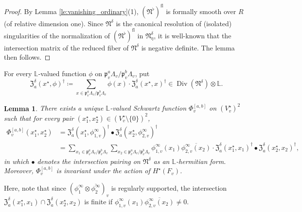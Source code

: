 \documentclass[12pt]{amsart}
\numberwithin{equation}{section}
\theoremstyle{plain}
\newtheorem{lem}[proposition]{Lemma}
\theoremstyle{definition}
\theoremstyle{remark}
\renewcommand{\d}[1]{\mathbb{#1}}
\newcommand{\f}[1]{\mathfrak{#1}}
\renewcommand{\r}[1]{\mathrm{#1}}
\renewcommand{\(}{\left(}
\renewcommand{\)}{\right)}
\newcommand{\ol}[1]{\overline{#1}{}}
\newcommand{\dL}{\d L}
\newcommand{\fN}{\f N}
\newcommand{\fZ}{\f Z}
\newcommand{\fp}{\f p}
\DeclareMathOperator{\Div}{Div}
\begin{document}
\begin{proof}
By Lemma \ref{le:vanishing_ordinary}(1), $(\fN^\flat)^{\r{fl}}$ is formally smooth over $R$ (of relative dimension one). Since $\fN^\delta$ is the canonical resolution of (isolated) singularities of the normalization of $(\fN^\flat)^{\r{fl}}$ in $\fN^\delta_\eta$, it is well-known that the intersection matrix of the reduced fiber of $\fN^\delta$ is negative definite. The lemma then follows.
\end{proof}


For every $\dL$-valued function $\phi$ on $\fp_v^a\Lambda_v/\fp_v^b\Lambda_v$, put
\[
\fZ_a^\delta(x^\star,\phi)^\dag\coloneqq\sum_{x\in\fp_v^a\Lambda_v/\fp_v^b\Lambda_v}\phi(x)\cdot\fZ_a^\delta(x^\star,x)^\dag
\in\Div(\fN^\delta)\otimes\dL.
\]





\begin{lem}\label{le:height_curve_split_2}
There exists a unique $\dL$-valued Schwartz function $\Phi^{[a,b]}_v$ on $(V^\star_v)^2$ such that for every pair $(x^\star_1,x^\star_2)\in(V^\star_v\setminus\{0\})^2$,
\begin{align*}
\Phi^{[a,b]}_v(x^\star_1,x^\star_2)
&=
\fZ_a^\delta(x^\star_1,\phi^\infty_{1,v})^\dag\bullet\fZ_a^\delta(x^\star_2,\phi^\infty_{2,v})^\dag \\
&=\sum_{x_1\in\fp_v^a\Lambda_v/\fp_v^b\Lambda_v}\sum_{x_2\in\fp_v^a\Lambda_v/\fp_v^b\Lambda_v}
\phi^\infty_{1,v}(x_1)\ol{\phi^\infty_{2,v}(x_2)}\cdot
\fZ_a^\delta(x^\star_1,x_1)^\dag\bullet\fZ_a^\delta(x^\star_2,x_2)^\dag,
\end{align*}
in which $\bullet$ denotes the intersection pairing on $\fN^\delta$ as an $\dL$-hermitian form. Moreover, $\Phi^{[a,b]}_v$ is invariant under the action of $H^\star(F_v)$.
\end{lem}

Here, note that since $(\phi^\infty_1\otimes\ol{\phi^\infty_2})_v$ is regularly supported, the intersection $\fZ_a^\delta(x^\star_1,x_1)\cap\fZ_a^\delta(x^\star_2,x_2)$ is finite if $\phi^\infty_{1,v}(x_1)\ol{\phi^\infty_{2,v}(x_2)}\neq 0$.
\end{document}

